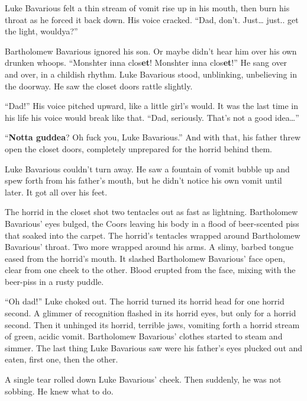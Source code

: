 Luke Bavarious felt a thin stream of vomit rise up in his mouth,
then burn his throat as he forced it back down. His voice cracked.
``Dad, don't. Just{\ldots} just.. get the light,
wouldya?''



Bartholomew Bavarious ignored his son. Or maybe didn't hear him over his
own drunken whoops. ``Monshter inna clos{\bf et}!  Monshter inna
clos{\bf et}!'' He sang over and over, in a childish rhythm. Luke
Bavarious stood, unblinking, unbelieving in the doorway. He saw the
closet doors rattle slightly.



``Dad!'' His voice pitched upward, like a little
girl's would. It was the last time in his life his voice
would break like that. ``Dad, seriously. That's not a
good idea{\ldots}''



``{\bf Notta guddea}? Oh fuck you, Luke Bavarious.'' And with
that, his father threw open the closet doors, completely unprepared
for the horrid behind them.



Luke Bavarious couldn't turn away. He saw a fountain of vomit
bubble up and spew forth from his father's mouth, but he
didn't notice his own vomit until later. It got all over his
feet.



The horrid in the closet shot two tentacles out as fast as
lightning. Bartholomew Bavarious' eyes bulged, the Coors
leaving his body in a flood of beer-scented piss that soaked into
the carpet. The horrid's tentacles wrapped around Bartholomew
Bavarious' throat. Two more wrapped around his arms. A slimy,
barbed tongue eased from the horrid's mouth. It slashed
Bartholomew Bavarious' face open, clear from one cheek to the
other. Blood erupted from the face, mixing with the beer-piss in a
rusty puddle.



``Oh dad!'' Luke choked out. The horrid turned its horrid
head for one horrid second. A glimmer of recognition flashed in its
horrid eyes, but only for a horrid second. Then it unhinged its
horrid, terrible jaws, vomiting forth a horrid stream of green,
acidic vomit. Bartholomew Bavarious' clothes started to steam
and simmer. The last thing Luke Bavarious saw were his
father's eyes plucked out and eaten, first one, then the
other.



A single tear rolled down Luke Bavarious' cheek. Then
suddenly, he was not sobbing. He knew what to do.



